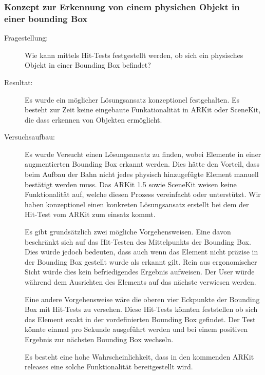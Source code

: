 \subsubsection{Konzept zur Erkennung von einem physichen Objekt in einer bounding Box}\label{subsub:prot-boundingbox}
\begin{description}
    \item[Fragestellung:] Wie kann mittels Hit-Tests festgestellt werden, ob sich ein physisches Objekt in einer Bounding Box befindet?
	\item[Resultat:] Es wurde ein möglicher Lösungsansatz konzeptionel festgehalten. Es besteht zur Zeit keine eingebaute Funkationalität in ARKit oder SceneKit, die dass erkennen von Objekten ermöglicht. 
    \item[Versuchsaufbau:] Es wurde Versucht einen Lösungsansatz zu finden, wobei Elemente in einer augmentierten Bounding Box erkannt werden. Dies hätte den Vorteil, dass beim Aufbau der Bahn nicht jedes physisch hinzugefügte Element manuell bestätigt werden muss. 
    Das ARKit 1.5 sowie SceneKit weisen keine Funktionalität auf, welche diesen Prozess vereinfacht oder unterstützt. Wir haben konzeptionel einen konkreten Lösungsansatz erstellt bei dem der Hit-Test vom ARKit zum einsatz kommt. 

    Es gibt grundsätzlich zwei mögliche Vorgehensweisen. Eine davon beschränkt sich auf das Hit-Testen des Mittelpunkts der Bounding Box. Dies würde jedoch bedeuten, dass auch wenn das Element nicht präzise in der Bounding Box gestellt wurde als erkannt gilt. Rein aus ergonomischer Sicht würde dies kein befriedigendes Ergebnis aufweisen. Der User würde während dem Ausrichten des Elements auf das nächste verwiesen werden. 
    
    Eine andere Vorgehensweise wäre die oberen vier Eckpunkte der Bounding Box mit Hit-Tests zu versehen. Diese Hit-Tests könnten feststellen ob sich das Element exakt in der vordefinierten Bounding Box gefindet. Der Test könnte einmal pro Sekunde ausgeführt werden und bei einem positiven Ergebnis zur nächsten Bounding Box wechseln.

    Es besteht eine hohe Wahrscheinlichkeit, dass in den kommenden ARKit releases eine solche Funktionalität bereitgestellt wird. 


\end{description}
